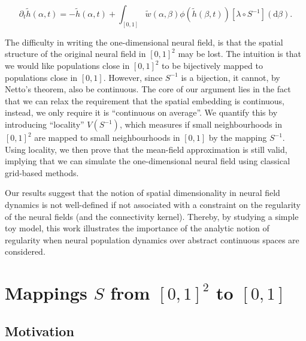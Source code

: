 \documentclass[NETN,manuscript]{stjour-new}
\def\d{\mathrm d}
\begin{document}
\begin{equation} \label{eq:nf-in-01}
\partial_t \tilde h(\alpha, t) = -\tilde h(\alpha, t) + \int_{[0,1]} \tilde w(\alpha, \beta) \phi(\tilde h(\beta, t)) \left[\lambda \circ S^{-1}\right](\d \beta).
\end{equation}

The difficulty in writing the one-dimensional neural field, is that the spatial structure of the original neural field in $[0,1]^2$ may be lost. The intuition is that we would like populations close in $[0,1]^2$ to be bijectively mapped to populations close in $[0,1]$. However, since $S^{-1}$ is a bijection, it cannot, by Netto's theorem, also be continuous. The core of our argument lies in the fact that we can relax the requirement that the spatial embedding is continuous, instead, we only require it is ``continuous on average''. We quantify this by introducing ``locality'' $V(S^{-1})$, which measures if small neighbourhoods in $[0,1]^2$ are mapped to small neighbourhoods in $[0,1]$ by the mapping $S^{-1}$. Using locality, we then prove that the mean-field approximation is still valid, implying that we can simulate the one-dimensional neural field using classical grid-based methods.




Our results suggest that the notion of spatial dimensionality in neural field dynamics is not well-defined if not associated with a constraint on the regularity of the neural fields (and the connectivity kernel). Thereby, by studying a simple toy model, this work illustrates the importance of the analytic notion of regularity when neural population dynamics over abstract continuous spaces are considered. 

\section{Mappings $S$ from $[0,1]^2$ to $[0,1]$}

\subsection{Motivation}
\end{document}
